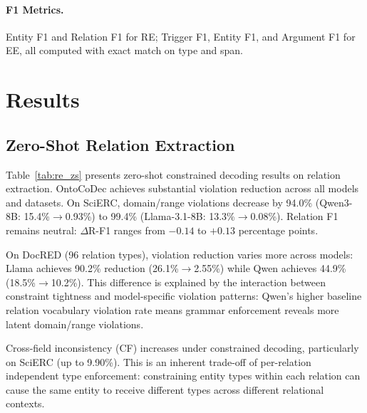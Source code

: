 \documentclass[11pt]{article}
\begin{document}
\paragraph{F1 Metrics.}
Entity F1 and Relation F1 for RE; Trigger F1, Entity F1, and Argument F1 for EE, all computed with exact match on type and span.

\section{Results}

\subsection{Zero-Shot Relation Extraction}

Table~\ref{tab:re_zs} presents zero-shot constrained decoding results on relation extraction.
OntoCoDec achieves substantial violation reduction across all models and datasets.
On SciERC, domain/range violations decrease by 94.0\% (Qwen3-8B: 15.4\%$\to$0.93\%) to 99.4\% (Llama-3.1-8B: 13.3\%$\to$0.08\%).
Relation F1 remains neutral: $\Delta$R-F1 ranges from $-0.14$ to $+0.13$ percentage points.

On DocRED (96 relation types), violation reduction varies more across models: Llama achieves 90.2\% reduction (26.1\%$\to$2.55\%) while Qwen achieves 44.9\% (18.5\%$\to$10.2\%).
This difference is explained by the interaction between constraint tightness and model-specific violation patterns: Qwen's higher baseline relation vocabulary violation rate means grammar enforcement reveals more latent domain/range violations.

Cross-field inconsistency (CF) increases under constrained decoding, particularly on SciERC (up to 9.90\%).
This is an inherent trade-off of per-relation independent type enforcement: constraining entity types within each relation can cause the same entity to receive different types across different relational contexts.
\end{document}
